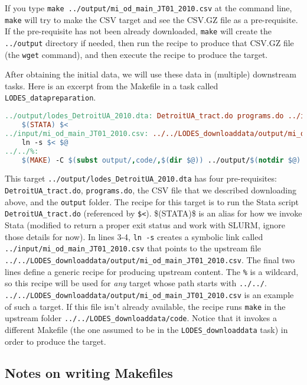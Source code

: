 If you type \texttt{make ../output/mi\_od\_main\_JT01\_2010.csv} at the command line, \texttt{make} will try to make the CSV target and see the CSV.GZ file as a pre-requisite.
If the pre-requisite has not been already downloaded, \texttt{make} will create the \texttt{../output} directory if needed,
then run the recipe to produce that CSV.GZ file (the \texttt{wget} command),
and then execute the recipe to produce the target.

After obtaining the initial data, we will use these data in (multiple) downstream tasks.
Here is an excerpt from the Makefile in a task called \texttt{LODES\_datapreparation}.
\begin{lstlisting}[language=make]
../output/lodes_DetroitUA_2010.dta: DetroitUA_tract.do programs.do ../input/mi_od_main_JT01_2010.csv | ../output
	$(STATA) $<
../input/mi_od_main_JT01_2010.csv: ../../LODES_downloaddata/output/mi_od_main_JT01_2010.csv | ../input
	ln -s $< $@
../../%:
	$(MAKE) -C $(subst output/,code/,$(dir $@)) ../output/$(notdir $@)
\end{lstlisting}
This target \texttt{../output/lodes\_DetroitUA\_2010.dta} has four pre-requisites:
\texttt{DetroitUA\_tract.do}, \texttt{programs.do}, the CSV file that we described downloading above, and the \texttt{output} folder.
The recipe for this target is to run the Stata script \texttt{DetroitUA\_tract.do} (referenced by \texttt{\$<}).
\$(STATA)\$ is an alias for how we invoke Stata
(modified to return a proper exit status and work with SLURM, ignore those details for now).
In lines 3-4, \texttt{ln -s} creates a symbolic link called \texttt{../input/mi\_od\_main\_JT01\_2010.csv} that points to the upstream file
\texttt{../../LODES\_downloaddata/output/mi\_od\_main\_JT01\_2010.csv}.
The final two lines define a generic recipe for producing upstream content.
The \texttt{\%} is a wildcard, so this recipe will be used for \textit{any} target whose path starts with \texttt{../../}.
\texttt{../../LODES\_downloaddata/output/mi\_od\_main\_JT01\_2010.csv} is an example of such a target.
If this file isn't already available,
the recipe runs \texttt{make} in the upstream folder
\texttt{../../LODES\_downloaddata/code}.
Notice that it invokes a different Makefile (the one assumed to be in the \texttt{LODES\_downloaddata} task)
in order to produce the target.

\subsection{Notes on writing Makefiles}

